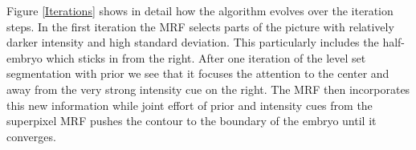 \documentclass{article} %
\begin{document}
Figure \ref{Iterations} shows in detail how the algorithm evolves over the iteration steps. In the first iteration the MRF selects parts of the picture with relatively darker intensity and high standard deviation. This particularly includes the half-embryo which sticks in from the right. After one iteration of the level set segmentation with prior we see that it focuses the attention to the center and away from the very strong intensity cue on the right. The MRF then incorporates this new information while joint effort of prior and intensity cues from the superpixel MRF pushes the contour to the boundary of the embryo until it converges.

\begin{figure}[htbp]
\centering
{}
\subfigure[]{
}
\end{figure}
\end{document}
